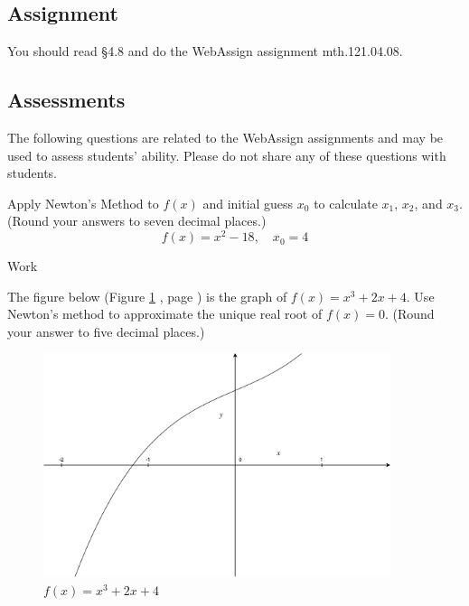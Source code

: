 \documentclass[12pt,addpoints, answers, fleqn]{exam}
\begin{document}
\subsection{Assignment}
You should read \S  4.8 and do the WebAssign assignment mth.121.04.08.
\vfill
\pagebreak
\begin{teacher}
\subsection{Assessments}
The following questions are related to the WebAssign assignments and may be used to assess students' ability. Please do not share any of these questions with students.
\begin{questions}	
\question 	%

Apply Newton's Method to $f\left(x\right)$ and initial guess $x_0$ to calculate $x_1$, $x_2$, and $x_3$. (Round your answers to seven decimal places.)
\[
f\left(x\right) = x^2 - 18, \quad x_0 = 4
\]

\begin{solution}
Work
\end{solution}

\question 	%

The figure below (Figure \ref{fig:nm250} , page \pageref{fig:nm250}) is the graph of $f\left(x\right) = x^3 + 2x + 4$. Use Newton's method to approximate the unique real root of $f\left(x\right) = 0$. (Round your answer to five decimal places.)
\begin{figure}[htbp] %
   \centering
   \includegraphics[width=4in]{./graphics/nm2501.pdf} 
   \caption{$f\left(x\right) = x^3 + 2x + 4$}
   \label{fig:nm250}
\end{figure}


\end{questions}
\end{teacher}
\end{document}

